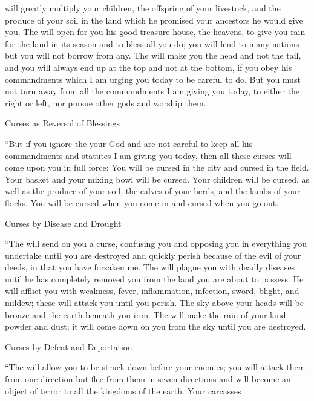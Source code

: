 {{}
will greatly
multiply
your children,
the offspring
of your livestock,
and the produce
of your soil
in the land
which
he promised
your ancestors
he would give you.
The
{}
will open
for you his good
treasure
house, the
heavens,
to give
you rain
for the land
in its season
and to bless
all
you do;
you will lend
to many
nations
but you
will not
borrow from any.
The
{}
will make you
the head
and not
the tail,
and you will
always
end up at the top and not
at the bottom,
if
you obey
his commandments
which
I am
urging
you today
to be careful
to do.
But you must not
turn
away from all
the commandments
I am
giving
you today,
to either the right
or left,
nor pursue
other
gods
and worship them.
\par }{\SH Curses as Reversal of Blessings
\par }{\PP {}“But if
you ignore
the {}
your God
and are not careful to keep
all
his commandments
and statutes
I
am giving
you today,
then all
these
curses
will come
upon
you in full force:
You
will be cursed
in the city
and cursed
in the field.
Your basket
and your mixing bowl
will be cursed.
Your children
will be cursed,
as well as the produce
of your soil,
the calves of your herds,
and the lambs
of your flocks.
You will be cursed
when you
come
in and cursed
when you
go out.
\par }{\SH Curses by Disease and Drought
\par }{\PP {}“The
{}
will send
on you a curse,
confusing
you and opposing you
in everything
you undertake
until
you are destroyed
and quickly
perish
because
of the evil
of your deeds,
in that
you have forsaken me.
The
{}
will plague
you with deadly diseases
until
he has completely removed
you from
the land
you
are about
to possess.
He will afflict
you with weakness,
fever,
inflammation,
infection,
sword,
blight,
and mildew;
these will attack
you until
you perish.
The sky
above
your heads
will be
bronze
and the earth
beneath
you iron.
The
{}
will make
the rain
of your land
powder
and dust;
it will come down
on
you from
the sky
until
you are destroyed.
\par }{\SH Curses by Defeat and Deportation
\par }{\PP {}“The
{}
will allow
you to be struck
down before
your enemies;
you will attack them from one
direction
but flee
from them
in seven
directions
and will become an object of terror
to all
the kingdoms
of the earth.
Your carcasses
}
